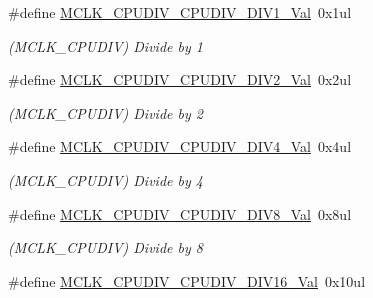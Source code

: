 \begin{DoxyCompactItemize}
\item 
\hypertarget{group___s_a_m_l21___m_c_l_k_gaaae3ea7bacfd57d32b6f68c9de98152e}{}\#define \hyperlink{group___s_a_m_l21___m_c_l_k_gaaae3ea7bacfd57d32b6f68c9de98152e}{M\+C\+L\+K\+\_\+\+C\+P\+U\+D\+I\+V\+\_\+\+C\+P\+U\+D\+I\+V\+\_\+\+D\+I\+V1\+\_\+\+Val}~0x1ul\label{group___s_a_m_l21___m_c_l_k_gaaae3ea7bacfd57d32b6f68c9de98152e}

\begin{DoxyCompactList}\small\item\em (M\+C\+L\+K\+\_\+\+C\+P\+U\+D\+I\+V) Divide by 1 \end{DoxyCompactList}\item 
\hypertarget{group___s_a_m_l21___m_c_l_k_ga15f305d7ac6e3dec87c96ef1636d1708}{}\#define \hyperlink{group___s_a_m_l21___m_c_l_k_ga15f305d7ac6e3dec87c96ef1636d1708}{M\+C\+L\+K\+\_\+\+C\+P\+U\+D\+I\+V\+\_\+\+C\+P\+U\+D\+I\+V\+\_\+\+D\+I\+V2\+\_\+\+Val}~0x2ul\label{group___s_a_m_l21___m_c_l_k_ga15f305d7ac6e3dec87c96ef1636d1708}

\begin{DoxyCompactList}\small\item\em (M\+C\+L\+K\+\_\+\+C\+P\+U\+D\+I\+V) Divide by 2 \end{DoxyCompactList}\item 
\hypertarget{group___s_a_m_l21___m_c_l_k_gaaaddab15620e9b154890594aef095ae3}{}\#define \hyperlink{group___s_a_m_l21___m_c_l_k_gaaaddab15620e9b154890594aef095ae3}{M\+C\+L\+K\+\_\+\+C\+P\+U\+D\+I\+V\+\_\+\+C\+P\+U\+D\+I\+V\+\_\+\+D\+I\+V4\+\_\+\+Val}~0x4ul\label{group___s_a_m_l21___m_c_l_k_gaaaddab15620e9b154890594aef095ae3}

\begin{DoxyCompactList}\small\item\em (M\+C\+L\+K\+\_\+\+C\+P\+U\+D\+I\+V) Divide by 4 \end{DoxyCompactList}\item 
\hypertarget{group___s_a_m_l21___m_c_l_k_ga7b62ecc83e4fa31634f6e69d8a32c8b5}{}\#define \hyperlink{group___s_a_m_l21___m_c_l_k_ga7b62ecc83e4fa31634f6e69d8a32c8b5}{M\+C\+L\+K\+\_\+\+C\+P\+U\+D\+I\+V\+\_\+\+C\+P\+U\+D\+I\+V\+\_\+\+D\+I\+V8\+\_\+\+Val}~0x8ul\label{group___s_a_m_l21___m_c_l_k_ga7b62ecc83e4fa31634f6e69d8a32c8b5}

\begin{DoxyCompactList}\small\item\em (M\+C\+L\+K\+\_\+\+C\+P\+U\+D\+I\+V) Divide by 8 \end{DoxyCompactList}\item 
\hypertarget{group___s_a_m_l21___m_c_l_k_ga0cfaa19877c910fea42fc0ac0f5aad9f}{}\#define \hyperlink{group___s_a_m_l21___m_c_l_k_ga0cfaa19877c910fea42fc0ac0f5aad9f}{M\+C\+L\+K\+\_\+\+C\+P\+U\+D\+I\+V\+\_\+\+C\+P\+U\+D\+I\+V\+\_\+\+D\+I\+V16\+\_\+\+Val}~0x10ul\label{group___s_a_m_l21___m_c_l_k_ga0cfaa19877c910fea42fc0ac0f5aad9f}


\end{DoxyCompactItemize}
